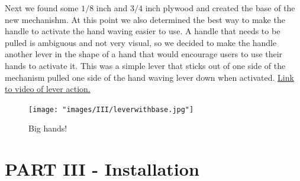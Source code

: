 \documentclass[11pt]{report}
\begin{document}
Next we found some $1/8$ inch and $3/4$ inch plywood and created the base of the new mechanishm. At this point we also determined the best way to make the handle to activate the hand waving easier to use. A handle that needs to be pulled is ambiguous and not very visual, so we decided to make the handle another lever in the shape of a hand that would encourage users to use their hands to activate it. This was a simple lever that sticks out of one side of the mechanism pulled one side of the hand waving lever down when activated. \href{https://drive.google.com/file/d/1A4jMRefTUcI-PZPhbS6XSqFU6V4kzS8j/view?usp=sharing}{Link to video of lever action.}


\begin{figure}[ht!]
\centering
\texttt{[image: "images/III/leverwithbase.jpg"]}
\caption{Big hands!}
\end{figure}









\clearpage
\section*{PART III - Installation}
\end{document}

